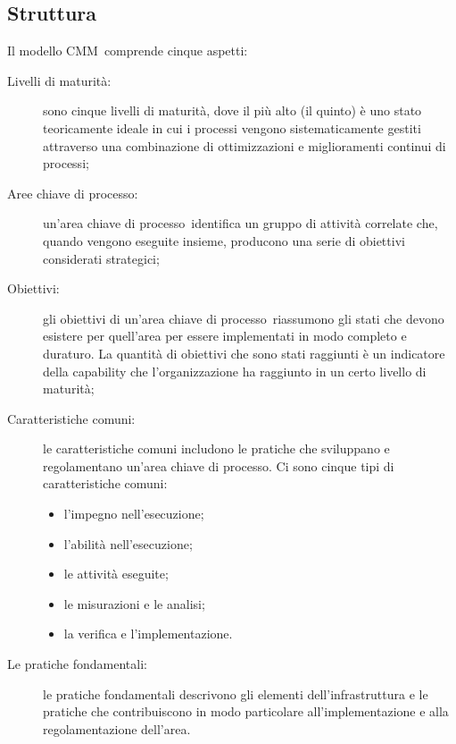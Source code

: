 \documentclass[../PianoDiQualifica.tex]{subfiles}
\begin{document}
\begin{appendices}
	\subsection{Struttura}
	Il modello CMM\g\ comprende cinque aspetti:
	\begin{description}
		\item[Livelli di maturità:] sono cinque livelli di maturità, dove il più alto (il quinto) è uno stato teoricamente ideale in cui i processi vengono sistematicamente gestiti attraverso una combinazione di ottimizzazioni e miglioramenti continui di processi;
		\item[Aree chiave di processo\g:] un'area chiave di processo\g\ identifica un gruppo di attività correlate che, quando vengono eseguite insieme, producono una serie di obiettivi considerati strategici;
		\item[Obiettivi:] gli obiettivi di un'area chiave di processo\g\ riassumono gli stati che devono esistere per quell'area per essere implementati in modo completo e duraturo. La quantità di obiettivi che sono stati raggiunti è un indicatore della capability che l'organizzazione ha raggiunto in un certo livello di maturità;
		\item[Caratteristiche comuni:] le caratteristiche comuni includono le pratiche che sviluppano e regolamentano un'area chiave di processo\g. Ci sono cinque tipi di caratteristiche comuni:
		\begin{itemize}
			\item l'impegno nell'esecuzione;
			\item l'abilità nell'esecuzione;
			\item le attività eseguite;
			\item le misurazioni e le analisi;
			\item la verifica e l'implementazione.
		\end{itemize}
		\item[Le pratiche fondamentali:] le pratiche fondamentali descrivono gli elementi dell'infrastruttura e le pratiche che contribuiscono in modo particolare all'implementazione e alla regolamentazione dell'area.
	\end{description}

\end{appendices}
\end{document}
